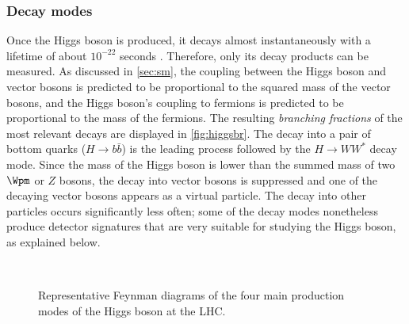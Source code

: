 \subsubsection{Decay modes}
Once the Higgs boson is produced, it decays almost instantaneously with a lifetime of about $10^{-22}$ seconds \cite{PDG2020}.
Therefore, only its decay products can be measured.
As discussed in \cref{sec:sm}, the coupling between the Higgs boson and vector bosons is predicted to be proportional to the squared mass of the vector bosons, and the Higgs boson's coupling to fermions is predicted to be proportional to the mass of the fermions. The resulting \emph{branching fractions} of the most relevant decays are displayed in \cref{fig:higgsbr}. 
The decay into a pair of bottom quarks ($H\rightarrow b\bar{b}$) is the leading process followed by the $H\rightarrow WW^*$ decay mode. Since the mass of the Higgs boson is lower than the summed mass of two $\Wpm$ or $Z$ bosons, the decay into vector bosons is suppressed and one of the decaying vector bosons appears as a virtual particle. The decay into other particles occurs significantly less often; some of the decay modes nonetheless produce detector signatures that are very suitable for studying the Higgs boson, as explained below.

\captionsetup[subfloat]{captionskip=10pt} %
\begin{figure}[t]
 \\
\caption[Feynman diagrams of Higgs boson production.]{Representative Feynman diagrams of the four main production modes of the Higgs boson at the LHC.}
\label{fig:higgsprodfeyn}
\end{figure}
\resetcaptionoffset

